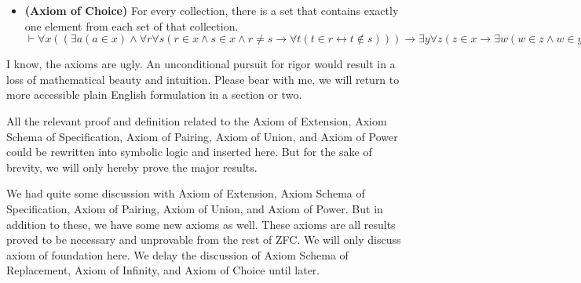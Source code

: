 \begin{ax}
\begin{itemize}
        $\vdash \exists x((\exists y(\forall z(z\not\in y))\wedge y\in x)\wedge \forall w(w\in x\to \exists u (\forall v(v\in u\leftrightarrow v\in w\vee v= w))\wedge u\in x))$
        \item[\textbf{ZFC10}]\textbf{(Axiom of Choice)} For every collection, there is a set that contains exactly one element from each set of that collection.\\
        $\vdash \forall x((\exists a (a\in x)\wedge \forall r\forall s(r\in x\wedge s\in x\wedge  r\neq s\to\forall t(t\in r\leftrightarrow t\not\in s)))\to \exists y\forall z(z\in x\to \exists w(w\in z\wedge w\in y\wedge (\forall \ell (\ell\in z\wedge \ell \in y\to \ell = w)))))$ 
    \end{itemize}
\end{ax}
\begin{rem}
    I know, the axioms are ugly. An unconditional pursuit for rigor would result in a loss of mathematical beauty and intuition. Please bear with me, we will return to more accessible plain English formulation in a section or two.
\end{rem}
\begin{rem}
    All the relevant proof and definition related to the Axiom of Extension, Axiom Schema of Specification, Axiom of Pairing, Axiom of Union, and Axiom of Power could be rewritten into symbolic logic and inserted here. But for the sake of brevity, we will only hereby prove the major results. 
\end{rem}
We had quite some discussion with Axiom of Extension, Axiom Schema of Specification, Axiom of Pairing, Axiom of Union, and Axiom of Power. But in addition to these, we have some new axioms as well. These axioms are all results proved to be necessary and unprovable from the rest of ZFC. We will only discuss axiom of foundation here. We delay the discussion of Axiom Schema of Replacement, Axiom of Infinity, and Axiom of Choice until later.